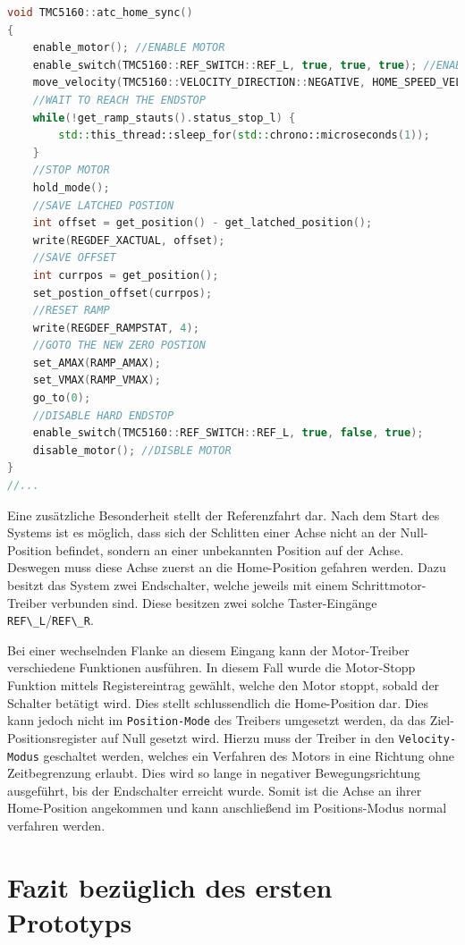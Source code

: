 \begin{lstlisting}[language={C++}]
void TMC5160::atc_home_sync()
{    
    enable_motor(); //ENABLE MOTOR
    enable_switch(TMC5160::REF_SWITCH::REF_L, true, true, true); //ENABLE LIMIT SWICHT => ENABLE HARD ENDSTOP
    move_velocity(TMC5160::VELOCITY_DIRECTION::NEGATIVE, HOME_SPEED_VELOCITY, 1000);  //MOVE NEGATIVE TO LIMIT SWITCH
    //WAIT TO REACH THE ENDSTOP
    while(!get_ramp_stauts().status_stop_l) {
        std::this_thread::sleep_for(std::chrono::microseconds(1));        
    }
    //STOP MOTOR
    hold_mode();
    //SAVE LATCHED POSTION
    int offset = get_position() - get_latched_position();
    write(REGDEF_XACTUAL, offset);
    //SAVE OFFSET
    int currpos = get_position();
    set_postion_offset(currpos);
    //RESET RAMP
    write(REGDEF_RAMPSTAT, 4);
    //GOTO THE NEW ZERO POSTION
    set_AMAX(RAMP_AMAX);
    set_VMAX(RAMP_VMAX);
    go_to(0);
    //DISABLE HARD ENDSTOP 
    enable_switch(TMC5160::REF_SWITCH::REF_L, true, false, true);
    disable_motor(); //DISBLE MOTOR
}
//...
\end{lstlisting}

Eine zusätzliche Besonderheit stellt der Referenzfahrt dar. Nach dem
Start des Systems ist es möglich, dass sich der Schlitten einer Achse
nicht an der Null-Position befindet, sondern an einer unbekannten
Position auf der Achse. Deswegen muss diese Achse zuerst an die
Home-Position gefahren werden. Dazu besitzt das System zwei Endschalter,
welche jeweils mit einem Schrittmotor-Treiber verbunden sind. Diese
besitzen zwei solche Taster-Eingänge
\passthrough{\lstinline!REF\_L!}/\passthrough{\lstinline!REF\_R!}.

Bei einer wechselnden Flanke an diesem Eingang kann der Motor-Treiber
verschiedene Funktionen ausführen. In diesem Fall wurde die Motor-Stopp
Funktion mittels Registereintrag gewählt, welche den Motor stoppt,
sobald der Schalter betätigt wird. Dies stellt schlussendlich die
Home-Position dar. Dies kann jedoch nicht im
\passthrough{\lstinline!Position-Mode!} des Treibers umgesetzt werden,
da das Ziel-Positionsregister auf Null gesetzt wird. Hierzu muss der
Treiber in den \passthrough{\lstinline!Velocity-Modus!} geschaltet
werden, welches ein Verfahren des Motors in eine Richtung ohne
Zeitbegrenzung erlaubt. Dies wird so lange in negativer
Bewegungsrichtung ausgeführt, bis der Endschalter erreicht wurde. Somit
ist die Achse an ihrer Home-Position angekommen und kann anschließend im
Positions-Modus normal verfahren werden.

\hypertarget{fazit-bezuxfcglich-des-ersten-prototyps}{%
\section{Fazit bezüglich des ersten
Prototyps}\label{fazit-bezuxfcglich-des-ersten-prototyps}}

